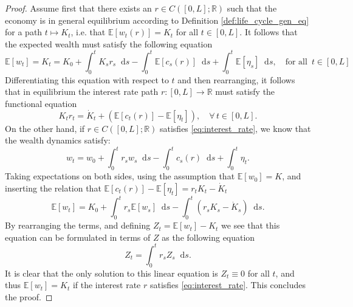 \documentclass[11pt,oneside,english,reqno,dvipsnames,table]{amsart}
\numberwithin{equation}{section}
\theoremstyle{plain}
\theoremstyle{definition}
\theoremstyle{remark}
\newtheorem{rem}[thm]{\protect\remarkname}
\theoremstyle{plain}
\theoremstyle{plain}
\theoremstyle{plain}
\theoremstyle{plain}
\theoremstyle{plain}
\theoremstyle{plain}
\theoremstyle{plain}
\providecommand{\remarkname}{Remark}
\providecommand{\remarkname}{Remark}
\newcommand{\EE}{\mathbb{E}}
\newcommand{\RR}{\mathbb{R}}
\newcommand{\dd}{\mathop{}\!\mathrm{d}}
\newcommand{\mbE}{\mathbb{E}}
\numberwithin{thm}{section}
\begin{document}
%
%
\begin{proof}
Assume first that there exists an $r\in C([0,L];\RR)$ such that the economy is in general equilibrium according to Definition \ref{def:life_cycle_gen_eq} for a path $t\mapsto K_t$, i.e. that  $\EE[w_t(r)]=K_t$ for all $t\in [0,L]$.  It follows that the expected wealth must satisfy the following equation 
%
\begin{equation*}
     \mbE[w_t] =K_t = K_0+\int_0^t K_sr_s \dd s -\int_0^t \EE[c_s(r)]\dd s +\int_0^t \EE[\eta_s] \dd s,\quad \text{for all }\, t\in [0,L] 
\end{equation*}
%
Differentiating this equation with respect to $t$ and then rearranging, it follows that in equilibrium the interest rate path $r:[0,L]\rightarrow \RR$ must satisfy the functional equation 
%
\begin{equation*}
    K_t r_t = \dot{K}_t+ \left( \EE[c_t(r)]- \EE[\eta_t] \right),\quad \forall \,t \in [0,L]. 
\end{equation*}
%
On the other hand, if $r\in C([0,L];\RR)$ satisfies \eqref{eq:interest_rate}, we know that the wealth dynamics  satisfy: 
%
\begin{equation*}
    w_t = w_0 + \int_0^t r_s w_s \dd s -\int_0^t c_s(r)\dd s +\int_0^t \eta_t. 
\end{equation*}
%
Taking expectations on both sides, using the assumption that $\EE[w_0]=K$, and inserting the relation that $ \EE[c_t(r)]- \EE[\eta_t] = r_tK_t-\dot{K}_t$
%
\begin{equation*}
       \EE [w_t] = K_0 + \int_0^t r_s\EE[w_s] \dd s - \int_0^t 
       \left(r_sK_s-\dot{K}_s  \right)\dd s. 
\end{equation*}
%
By rearranging the terms, and defining $Z_t=\EE[w_t]-K_t$ we see that this equation can be formulated in terms of $Z$ as the following equation
%
\begin{equation}
    Z_t=\int_0^t r_s Z_s \dd s.
\end{equation}
%
It is clear that the only solution to this linear equation is $Z_t\equiv 0$ for all $t$, and thus $\EE[w_t]=K_t$ if the interest rate $r$ satisfies \eqref{eq:interest_rate}. This concludes the proof. 
\end{proof}
\end{document}
